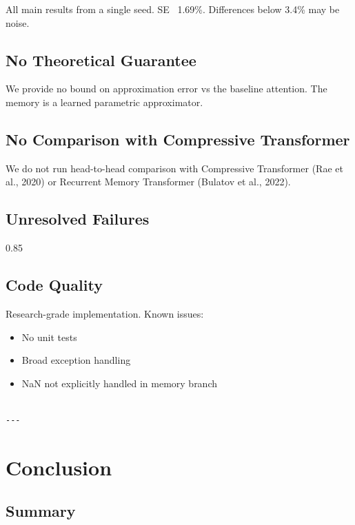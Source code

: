 All main results from a single seed. SE ~1.69\%. Differences below 3.4\% 
may be noise.

\subsection{No Theoretical Guarantee}

We provide no bound on approximation error vs the baseline attention. 
The memory is a learned parametric approximator.

\subsection{No Comparison with Compressive Transformer}

We do not run head-to-head comparison with Compressive Transformer (Rae et 
al., 2020) or Recurrent Memory Transformer (Bulatov et al., 2022).

\subsection{Unresolved Failures}

0.85

\subsection{Code Quality}

Research-grade implementation. Known issues:

\begin{itemize}
\item No unit tests
\item Broad exception handling
\item NaN not explicitly handled in memory branch
\end{itemize}
\begin{lstlisting}

---
\end{lstlisting}


\section{Conclusion}

\subsection{Summary}

